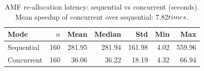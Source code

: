 \begin{table}[htbp]
\centering
\caption{AMF re-allocation latency: sequential vs concurrent (seconds). Mean speedup of concurrent over sequential: 7.82$\\times$.}
\label{tab:comparison}
\begin{tabular}{lrrrrrr}
\hline
Mode & $n$ & Mean & Median & Std & Min & Max \\
\hline
Sequential & 160 & 281.95 & 281.94 & 161.98 & 4.02 & 559.96 \\
Concurrent & 160 & 36.06 & 36.22 & 18.19 & 4.32 & 66.94 \\
\hline
\end{tabular}
\end{table}
